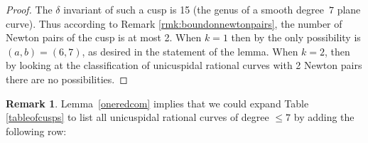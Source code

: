 \documentclass[JEP,XML,SOM,Unicode,NoFloatCountersInSection,published]{cedram}
\theoremstyle{plain}
\theoremstyle{definition}
\newtheorem{remark}[theorem]{Remark}
\begin{document}
\begin{proof}
The $\delta$ invariant of such a cusp is 15 (the genus of a smooth degree~$7$ plane curve). Thus according to Remark \ref{rmk:boundonnewtonpairs}, the number of Newton pairs of the cusp is at most 2. When $k=1$ then by \cite[Th.\,1.1]{Unicuspidalcurves} the only possibility is $(a,b)=(6,7)$, as desired in the statement of the lemma. When $k=2$, then by looking at the classification \cite[Th.\,1.1]{TKThesis} of unicuspidal rational curves with 2 Newton pairs there are no possibilities.
\end{proof}

\begin{remark}
Lemma~\ref{oneredcom} implies that we could expand Table \ref{tableofcusps} to list all unicuspidal rational curves of degree $\le 7$ by adding the following row:

\begin{center}
\vspace*{-.5\baselineskip}
\renewcommand{\arraystretch}{1.2}
\begin{table}[htb]
\end{table}
\vspace*{-2\baselineskip}
\end{center}
\end{remark}
\end{document}

